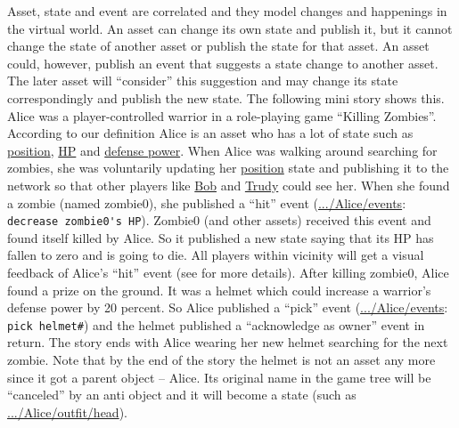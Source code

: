 \documentclass{sigchi}
\begin{document}
Asset, state and event are correlated and they model changes and happenings in the virtual world. An asset can change its own state and publish it, but it cannot change the state of another asset or publish the state for that asset. An asset could, however, publish an event that suggests a state change to another asset. The later asset will ``consider'' this suggestion and may change its state correspondingly and publish the new state. The following mini story shows this. Alice was a player-controlled warrior in a role-playing game ``Killing Zombies''. According to our definition Alice is an asset who has a lot of state such as \url{position}, \url{HP} and \url{defense power}. When Alice was walking around searching for zombies, she was voluntarily updating her \url{position} state and publishing it to the network so that other players like \url{Bob} and \url{Trudy} could see her. When she found a zombie (named zombie0), she published a ``hit'' event (\url{.../Alice/events}: \verb|decrease zombie0's HP|). Zombie0 (and other assets) received this event and found itself killed by Alice. So it published a new state saying that its HP has fallen to zero and is going to die. All players within vicinity will get a visual feedback of Alice's ``hit'' event (see  for more details). After killing zombie0, Alice found a prize on the ground. It was a helmet which could increase a warrior's defense power by 20 percent. So Alice published a ``pick'' event (\url{.../Alice/events}: \verb|pick helmet#|) and the helmet published a ``acknowledge as owner'' event in return. The story ends with Alice wearing her new helmet searching for the next zombie. Note that by the end of the story the helmet is not an asset any more since it got a parent object -- Alice. Its original name in the game tree will be ``canceled'' by an anti object and it will become a state (such as \url{.../Alice/outfit/head}).




\end{document}
